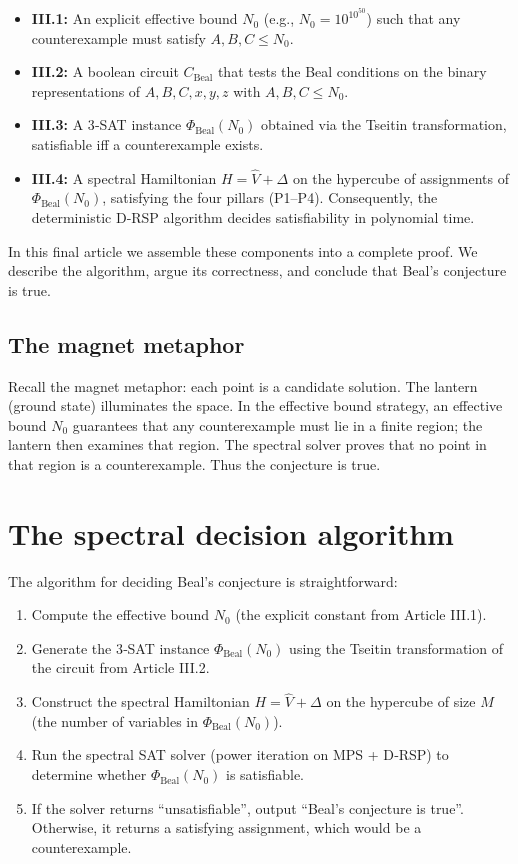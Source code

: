 \documentclass[11pt,a4paper]{article}
\begin{document}
\begin{itemize}
\item \textbf{III.1:} An explicit effective bound \(N_0\) (e.g., \(N_0 = 10^{10^{50}}\)) such that any counterexample must satisfy \(A,B,C \le N_0\).
\item \textbf{III.2:} A boolean circuit \(C_{\text{Beal}}\) that tests the Beal conditions on the binary representations of \(A,B,C,x,y,z\) with \(A,B,C \le N_0\).
\item \textbf{III.3:} A 3‑SAT instance \(\Phi_{\text{Beal}}(N_0)\) obtained via the Tseitin transformation, satisfiable iff a counterexample exists.
\item \textbf{III.4:} A spectral Hamiltonian \(H = \hat{V} + \Delta\) on the hypercube of assignments of \(\Phi_{\text{Beal}}(N_0)\), satisfying the four pillars (P1–P4). Consequently, the deterministic D‑RSP algorithm decides satisfiability in polynomial time.
\end{itemize}

In this final article we assemble these components into a complete proof. We describe the algorithm, argue its correctness, and conclude that Beal's conjecture is true.

\subsection{The magnet metaphor}

Recall the magnet metaphor: each point is a candidate solution. The lantern (ground state) illuminates the space. In the effective bound strategy, an effective bound \(N_0\) guarantees that any counterexample must lie in a finite region; the lantern then examines that region. The spectral solver proves that no point in that region is a counterexample. Thus the conjecture is true.

\section{The spectral decision algorithm}

The algorithm for deciding Beal's conjecture is straightforward:

\begin{enumerate}
\item Compute the effective bound \(N_0\) (the explicit constant from Article III.1).
\item Generate the 3‑SAT instance \(\Phi_{\text{Beal}}(N_0)\) using the Tseitin transformation of the circuit from Article III.2.
\item Construct the spectral Hamiltonian \(H = \hat{V} + \Delta\) on the hypercube of size \(M\) (the number of variables in \(\Phi_{\text{Beal}}(N_0)\)).
\item Run the spectral SAT solver (power iteration on MPS + D‑RSP) to determine whether \(\Phi_{\text{Beal}}(N_0)\) is satisfiable.
\item If the solver returns “unsatisfiable”, output “Beal's conjecture is true”. Otherwise, it returns a satisfying assignment, which would be a counterexample.
\end{enumerate}
\end{document}

